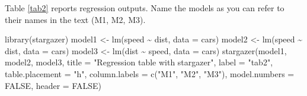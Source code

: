 \documentclass[
  12pt,
]{article}
\newenvironment{Shaded}{\begin{snugshade}}{\end{snugshade}}
\newcommand{\AttributeTok}[1]{\textcolor[rgb]{0.77,0.63,0.00}{#1}}
\newcommand{\ConstantTok}[1]{\textcolor[rgb]{0.00,0.00,0.00}{#1}}
\newcommand{\FunctionTok}[1]{\textcolor[rgb]{0.00,0.00,0.00}{#1}}
\newcommand{\NormalTok}[1]{#1}
\newcommand{\OtherTok}[1]{\textcolor[rgb]{0.56,0.35,0.01}{#1}}
\newcommand{\SpecialCharTok}[1]{\textcolor[rgb]{0.00,0.00,0.00}{#1}}
\newcommand{\StringTok}[1]{\textcolor[rgb]{0.31,0.60,0.02}{#1}}
\begin{document}
Table \ref{tab2} reports regression outputs. Name the models as you can refer
to their names in the text (M1, M2, M3).

\begin{Shaded}
\begin{Highlighting}[]
\FunctionTok{library}\NormalTok{(stargazer)}
\NormalTok{model1 }\OtherTok{\textless{}{-}} \FunctionTok{lm}\NormalTok{(speed }\SpecialCharTok{\textasciitilde{}}\NormalTok{ dist, }\AttributeTok{data =}\NormalTok{ cars)}
\NormalTok{model2 }\OtherTok{\textless{}{-}} \FunctionTok{lm}\NormalTok{(speed }\SpecialCharTok{\textasciitilde{}}\NormalTok{ dist, }\AttributeTok{data =}\NormalTok{ cars)}
\NormalTok{model3 }\OtherTok{\textless{}{-}} \FunctionTok{lm}\NormalTok{(dist }\SpecialCharTok{\textasciitilde{}}\NormalTok{ speed, }\AttributeTok{data =}\NormalTok{ cars)}
\FunctionTok{stargazer}\NormalTok{(model1, model2, model3,}
          \AttributeTok{title =} \StringTok{"Regression table with stargazer"}\NormalTok{,}
          \AttributeTok{label =} \StringTok{"tab2"}\NormalTok{,}
          \AttributeTok{table.placement =} \StringTok{"h"}\NormalTok{,}
          \AttributeTok{column.labels =} \FunctionTok{c}\NormalTok{(}\StringTok{"M1"}\NormalTok{, }\StringTok{"M2"}\NormalTok{, }\StringTok{"M3"}\NormalTok{),}
          \AttributeTok{model.numbers =} \ConstantTok{FALSE}\NormalTok{,}
          \AttributeTok{header =} \ConstantTok{FALSE}\NormalTok{)}
\end{Highlighting}
\end{Shaded}
\end{document}
